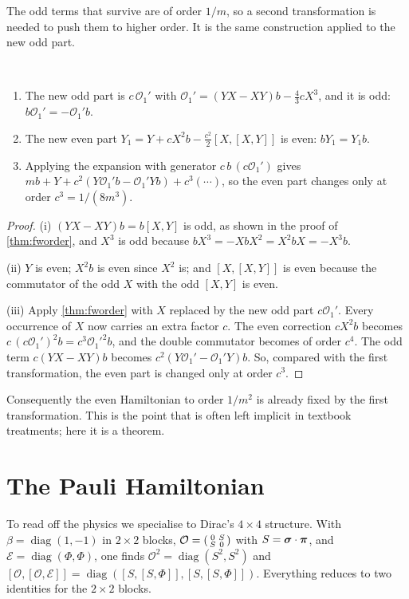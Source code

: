 The odd terms that survive are of order $1/m$, so a second transformation is needed to push them to higher order. It is the same construction applied to the new odd part.

\begin{proposition}\label{prop:secondfw}\ver\
\begin{enumerate}[label=(\roman*)]
\item The new odd part is $c\,\mathcal O_1'$ with $\mathcal O_1'=(YX-XY)b-\tfrac43cX^3$, and it is odd: $b\mathcal O_1'=-\mathcal O_1'b$.
\item The new even part $Y_1=Y+cX^2b-\tfrac{c^2}2[X,[X,Y]]$ is even: $bY_1=Y_1b$.
\item Applying the expansion with generator $c\,b\,(c\mathcal O_1')$ gives $mb+Y+c^2(Y\mathcal O_1'b-\mathcal O_1'Yb)+c^3(\cdots)$, so the even part changes only at order $c^3=1/(8m^3)$.
\end{enumerate}
\end{proposition}
\begin{proof}
(i) $(YX-XY)b=b[X,Y]$ is odd, as shown in the proof of \cref{thm:fworder}, and $X^3$ is odd because $bX^3=-XbX^2=X^2bX=-X^3b$.

(ii) $Y$ is even; $X^2b$ is even since $X^2$ is; and $[X,[X,Y]]$ is even because the commutator of the odd $X$ with the odd $[X,Y]$ is even.

(iii) Apply \cref{thm:fworder} with $X$ replaced by the new odd part $c\mathcal O_1'$. Every occurrence of $X$ now carries an extra factor $c$. The even correction $cX^2b$ becomes $c\,(c\mathcal O_1')^2b=c^3\mathcal O_1'^2b$, and the double commutator becomes of order $c^4$. The odd term $c(YX-XY)b$ becomes $c^2(Y\mathcal O_1'-\mathcal O_1'Y)b$. So, compared with the first transformation, the even part is changed only at order $c^3$.
\end{proof}


Consequently the even Hamiltonian to order $1/m^2$ is already fixed by the first transformation. This is the point that is often left implicit in textbook treatments; here it is a theorem.

\section{The Pauli Hamiltonian}

To read off the physics we specialise to Dirac's $4\times4$ structure. With $\beta=\operatorname{diag}(1,-1)$ in $2\times2$ blocks, $\mathcal O=\begin{psmallmatrix}0&S\\S&0\end{psmallmatrix}$ with $S=\boldsymbol{\sigma}\cdot\bm\pi$, and $\mathcal E=\operatorname{diag}(\Phi,\Phi)$, one finds $\mathcal O^2=\operatorname{diag}(S^2,S^2)$ and $[\mathcal O,[\mathcal O,\mathcal E]]=\operatorname{diag}([S,[S,\Phi]],[S,[S,\Phi]])$. Everything reduces to two identities for the $2\times2$ blocks.

